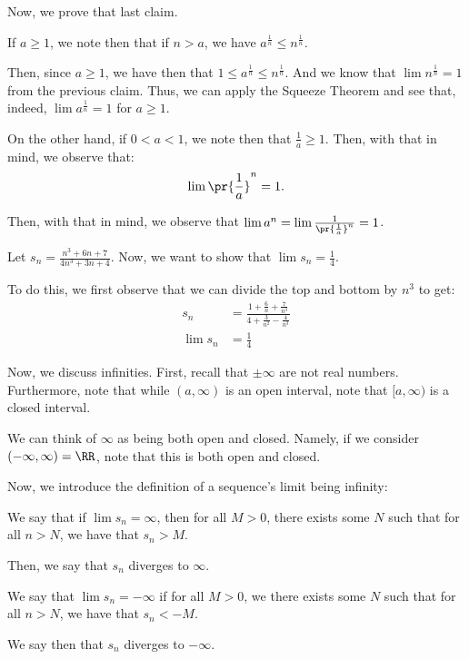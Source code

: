 \documentclass[openany]{book}
\begin{document}
\begin{example}
	Now, we prove that last claim.
	
	If $a \geq 1$, we note then that if $n > a$, we have $a^{\frac{1}{n}} \leq n^{\frac{1}{n}}$.
	
	Then, since $a \geq 1$, we have then that $1 \leq a^{\frac{1}{n}} \leq n^{\frac{1}{n}}$. And we know that $\lim n^{\frac{1}{n}} = 1$ from the previous claim. Thus, we can apply the Squeeze Theorem and see that, indeed, $\lim a^{\frac{1}{n}} = 1$ for $a \geq 1$.
	
	On the other hand, if $0 < a < 1$, we note then that $\frac{1}{a} \geq 1$. Then, with that in mind, we observe that:
	\begin{equation*}
		\lim \pr{\frac 1 a}^{n} = 1.
	\end{equation*}
	
	Then, with that in mind, we observe that $\lim a^{n} = \lim \frac{1}{\pr{\frac{1}{a}}^{n}} = 1$.
\end{example}

\begin{example}
	Let $s_n = \frac{n^{3} + 6n + 7}{4n^{3} + 3n + 4}$. Now, we want to show that $\lim s_n = \frac{1}{4}$.
	
	To do this, we first observe that we can divide the top and bottom by $n^{3}$ to get:
	\begin{align*}
		s_n &= \frac{1+ \frac 6 n + \frac 7{n^{3}}} {4 + \frac 3 {n^{2}} - \frac 4{n^{3}}} \\
		\lim s_n &= \frac 1 4
	\end{align*}
\end{example}

Now, we discuss infinities. First, recall that $\pm \infty$ are not real numbers. Furthermore, note that while $(a, \infty)$ is an open interval, note that $[a, \infty)$ is a closed interval.

We can think of $\infty$ as being both open and closed. Namely, if we consider $(-\infty, \infty) = \RR$, note that this is both open and closed.

Now, we introduce the definition of a sequence's limit being infinity:
\begin{defn}
	We say that if $\lim s_n = \infty$, then for all $M > 0$, there exists some $N$ such that for all $n > N$, we have that $s_n > M$.
	
	Then, we say that $s_n$ diverges to $\infty$.
\end{defn}

\begin{defn}
	We say that $\lim s_n = -\infty$ if for all $M > 0$, we there exists some $N$ such that for all $n > N$, we have that $s_n < -M$.
	
	We say then that $s_n$ diverges to $-\infty$.
\end{defn}
\end{document}
